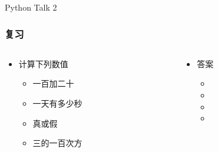 



\PreFirstFrame
\begin{frame} [fragile]
	\centerline{\fontsize{42}{42}\selectfont Python Talk 2}
\end{frame}
\PostFirstFrame

\begin{frame} [fragile]
	\frametitle{复习}
	\linespread{2}
	\begin{columns}[T]
		\begin{column}[T]{.5\textwidth}
			\begin{itemize}
			\item 计算下列数值
				\begin{itemize}
				\item 一百加二十
				\item 一天有多少秒
				\item 真或假
				\item 三的一百次方
				\end{itemize}
			\end{itemize}
		\end{column}
		\begin{column}[T]{.5\textwidth}
			\begin{itemize}
			\item 答案
				\begin{itemize}
				\item {}
				\item {}
				\item {}
				\item {}
				\end{itemize}
			\end{itemize}
		\end{column}
	\end{columns}
\end{frame}

